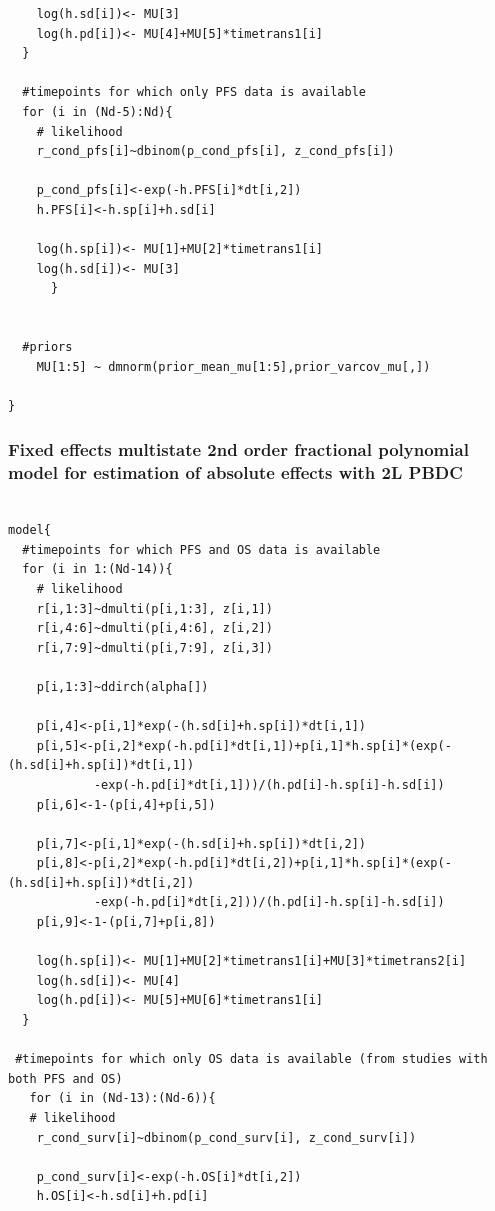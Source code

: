 \documentclass[11pt,final,fleqn]{article}\usepackage[]{graphicx}\usepackage[]{color}
\theoremstyle{plain}
\begin{document}
\begin{appendices}
\begin{verbatim}
    log(h.sd[i])<- MU[3] 
    log(h.pd[i])<- MU[4]+MU[5]*timetrans1[i]
  }
    
  #timepoints for which only PFS data is available 
  for (i in (Nd-5):Nd){
    # likelihood
    r_cond_pfs[i]~dbinom(p_cond_pfs[i], z_cond_pfs[i]) 
    
    p_cond_pfs[i]<-exp(-h.PFS[i]*dt[i,2])
    h.PFS[i]<-h.sp[i]+h.sd[i]
    
    log(h.sp[i])<- MU[1]+MU[2]*timetrans1[i]
    log(h.sd[i])<- MU[3] 
      }
  
  
  #priors
    MU[1:5] ~ dmnorm(prior_mean_mu[1:5],prior_varcov_mu[,]) 

}

\end{verbatim}

\subsubsection{Fixed effects multistate 2nd order fractional polynomial  model for estimation of absolute effects with 2L PBDC} 
\begin{verbatim} 

model{
  #timepoints for which PFS and OS data is available
  for (i in 1:(Nd-14)){
    # likelihood
    r[i,1:3]~dmulti(p[i,1:3], z[i,1]) 
    r[i,4:6]~dmulti(p[i,4:6], z[i,2]) 
    r[i,7:9]~dmulti(p[i,7:9], z[i,3]) 
    
    p[i,1:3]~ddirch(alpha[])
    
    p[i,4]<-p[i,1]*exp(-(h.sd[i]+h.sp[i])*dt[i,1])
    p[i,5]<-p[i,2]*exp(-h.pd[i]*dt[i,1])+p[i,1]*h.sp[i]*(exp(-(h.sd[i]+h.sp[i])*dt[i,1])
    		-exp(-h.pd[i]*dt[i,1]))/(h.pd[i]-h.sp[i]-h.sd[i])
    p[i,6]<-1-(p[i,4]+p[i,5])
    
    p[i,7]<-p[i,1]*exp(-(h.sd[i]+h.sp[i])*dt[i,2])
    p[i,8]<-p[i,2]*exp(-h.pd[i]*dt[i,2])+p[i,1]*h.sp[i]*(exp(-(h.sd[i]+h.sp[i])*dt[i,2])
    		-exp(-h.pd[i]*dt[i,2]))/(h.pd[i]-h.sp[i]-h.sd[i])
    p[i,9]<-1-(p[i,7]+p[i,8])
    
    log(h.sp[i])<- MU[1]+MU[2]*timetrans1[i]+MU[3]*timetrans2[i] 
    log(h.sd[i])<- MU[4] 
    log(h.pd[i])<- MU[5]+MU[6]*timetrans1[i]
  }
  
 #timepoints for which only OS data is available (from studies with both PFS and OS)
   for (i in (Nd-13):(Nd-6)){
   # likelihood
    r_cond_surv[i]~dbinom(p_cond_surv[i], z_cond_surv[i]) 
    
    p_cond_surv[i]<-exp(-h.OS[i]*dt[i,2])
    h.OS[i]<-h.sd[i]+h.pd[i]
    

\end{verbatim}
\end{appendices}
\end{document}
